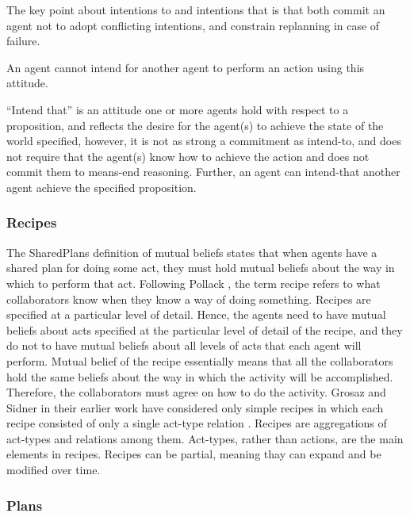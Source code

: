 \documentclass[11pt]{article}
\begin{document}
The key point about intentions to and intentions that is that both commit an
agent not to adopt conflicting intentions, and constrain replanning in case of
failure.

An agent cannot intend for another agent to perform an action using this
attitude.

``Intend that'' is an attitude one or more agents hold with respect to a
proposition, and reflects the desire for the agent(s) to achieve the state of
the world specified, however, it is not as strong a commitment as intend-to, and
does not require that the agent(s) know how to achieve the action and does not
commit them to means-end reasoning. Further, an agent can intend-that another
agent achieve the specified proposition.

\subsubsection{Recipes}

The SharedPlans definition of mutual beliefs states that when agents have a
shared plan for doing some act, they must hold mutual beliefs about the way in
which to perform that act. Following Pollack
\cite{pollack:plan-mental-attitudes}, the term recipe refers to what
collaborators know when they know a way of doing something. Recipes are
specified at a particular level of detail. Hence, the agents need to have mutual
beliefs about acts specified at the particular level of detail of the recipe,
and they do not to have mutual beliefs about all levels of acts that each agent
will perform. Mutual belief of the recipe essentially means that all the
collaborators hold the same beliefs about the way in which the activity will be
accomplished. Therefore, the collaborators must agree on how to do the activity.
Grosaz and Sidner in their earlier work \cite{grosz:plans-discourse} have
considered only simple recipes in which each recipe consisted of only a single
act-type relation \cite{lochbaum:plan-models}. Recipes are aggregations of
act-types and relations among them. Act-types, rather than actions, are the main
elements in recipes. Recipes can be partial, meaning thay can expand and be
modified over time.

\subsubsection{Plans}
\end{document}
